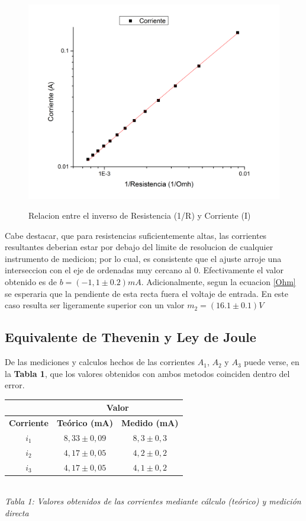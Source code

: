 \documentclass[11pt,a4paper]{article}
\begin{document}
\begin{figure}[h]
  \centering
  \includegraphics[scale=0.4]{Corriente_vs_InversoResistencia}
  \\[1.0cm]
  \caption{Relacion entre el inverso de Resistencia (1/R) y Corriente (I)}
  \label{fig:Ohm_hip}
\end{figure}

 Cabe destacar, que para resistencias suficientemente altas, las corrientes resultantes deberian estar por debajo del limite de resolucion de cualquier instrumento de medicion; por lo cual, es consistente que el ajuste arroje una interseccion con el eje de ordenadas muy cercano al 0. Efectivamente el valor obtenido es de $b = (-1,1 \pm 0.2)mA$. Adicionalmente, segun la ecuacion \eqref{Ohm} se esperaria que la pendiente de esta recta fuera el voltaje de entrada. En este caso resulta ser ligeramente superior con un valor $m_2 = (16.1\pm0.1)V$

\subsection{Equivalente de Thevenin y Ley de Joule}

 
De las mediciones y calculos hechos de las corrientes $A_1$, $A_2$ y $A_3$ puede verse, en la \textbf{Tabla 1}, que los valores obtenidos con ambos metodos coinciden dentro del error. 

\begin{center}
\begin{tabular}{||c|c|c||}
\hline
& \multicolumn{2}{c||}{\textbf{Valor}} \\ \hline
\textbf{Corriente} & \textbf{Teórico (mA)} & \textbf{Medido (mA)} \\ \hline 
$i_1$ & $8,33\pm0,09$ & $8,3\pm0,3$ \\ \hline 
$i_2$ & $4,17\pm0,05$ & $4,2\pm0,2$ \\ \hline 
$i_3$ & $4,17\pm0,05$ & $4,1\pm0,2$ \\ \hline 
\end{tabular}\\

\textit{Tabla 1: Valores obtenidos de las corrientes mediante cálculo (teórico) y medición directa}
\end{center}
\end{document}

